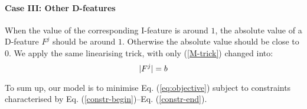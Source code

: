 \paragraph{Case III: Other D-features} When the value of the corresponding I-feature is around $1$, the absolute value of a D-feature $F^j$ should be around $1$.
Otherwise the absolute value should be close to $0$. 
We apply the same linearising trick, with only (\ref{M-trick}) changed into:
\begin{equation} \label{constr-end}
    \setlen
    |F^j|=b
\end{equation}

To sum up, our model is to minimise Eq. (\ref{eq:objective}) subject to constraints characterised by Eq. (\ref{constr-begin})--Eq. (\ref{constr-end}).
